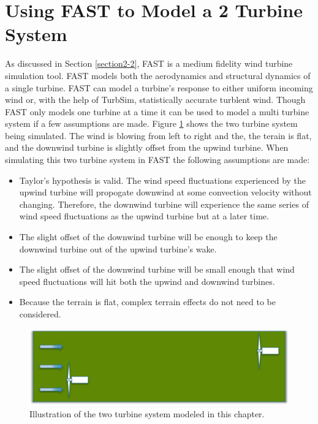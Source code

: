 
\section{Using FAST to Model a 2 Turbine System} \label{section3-2}

As discussed in Section \ref{section2-2}, FAST is a medium fidelity wind turbine simulation tool. FAST models both the aerodynamics and structural dynamics of a single turbine. FAST can model a turbine's response to either uniform incoming wind or, with the help of TurbSim, statistically accurate turblent wind. Though FAST only models one turbine at a time it can be used to model a multi turbine system if a few assumptions are made. Figure \ref{fig3-5} shows the two turbine system being simulated. The wind is blowing from left to right and the, the terain is flat, and the downwind turbine is slightly offset from the upwind turbine. When simulating this two turbine system in FAST the following assumptions are made:

\begin{itemize}
  \item Taylor's hypothesis is valid. The wind speed fluctuations experienced by the upwind turbine will propogate downwind at some convection velocity without changing. Therefore, the downwind turbine will experience the same series of wind speed fluctuations as the upwind turbine but at a later time.
  \item The slight offset of the downwind turbine will be enough to keep the downwind turbine out of the upwind turbine's wake.
  \item The slight offset of the downwind turbine will be small enough that wind speed fluctuations will hit both the upwind and downwind turbines.
  \item Because the terrain is flat, complex terrain effects do not need to be considered.
\end{itemize}


 \begin{figure}[htbp]
	\centering
		\includegraphics[width=\linewidth]{Figures/ch3Figures/fig3-5.png}
		
	\caption{Illustration of the two turbine system modeled in this chapter.}
	\label{fig3-5}
\end{figure}

